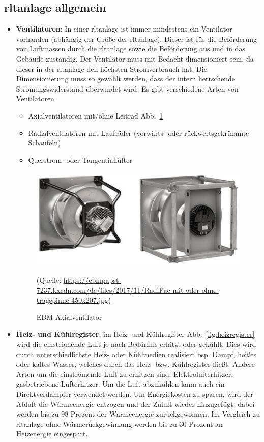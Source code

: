 \subsection{\ac{rltanlage} allgemein}
\begin{itemize}
	\item \textbf{Ventilatoren}: In einer \ac{rltanlage} ist immer mindestens ein Ventilator vorhanden (abhängig der Größe der \ac{rltanlage}). Dieser ist für die Beförderung von Luftmassen durch die \ac{rltanlage} sowie die Beförderung aus und in das Gebäude zuständig. Der Ventilator muss mit Bedacht dimensioniert sein, da dieser in der \ac{rltanlage} den höchsten Stromverbrauch hat. Die Dimensionierung muss so gewählt werden, dass der intern herrschende Strömungswiderstand überwindet wird. Es gibt verschiedene Arten von Ventilatoren 
	\begin{itemize}
		\item Axialventilatoren mit/ohne Leitrad Abb.~\ref{fig:EBM_Axialventilator}
		\item Radialventilatoren mit Laufräder (vorwärts- oder rückwertsgekrümmte Schaufeln)
		\item Querstrom- oder Tangentiallüfter 
	\end{itemize}
	
	\begin{figure}[H]
		\centering
		\includegraphics[width=0.5\linewidth]{Bilder/axialventilator}
		\caption{EBM Axialventilator} 
		(Quelle: \url{https://ebmpapst-7237.kxcdn.com/de/files/2017/11/RadiPac-mit-oder-ohne-tragspinne-450x207.jpg})
		\label{fig:EBM_Axialventilator}
	\end{figure}

	\item \textbf{Heiz- und Kühlregister}: im Heiz- und Kühlregister Abb.~\ref{fig:heizregister} wird die einströmende Luft je nach Bedürfnis erhitzt oder gekühlt. Dies wird durch unterschiedlichste Heiz- oder Kühlmedien realisiert bsp. Dampf, heißes oder kaltes Wasser, welches durch das Heiz- bzw. Kühlregister fließt. Andere Arten um die einströmende Luft zu erhitzen sind: Elektrolufterhitzer, gasbetriebene Lufterhitzer. Um die Luft abzukühlen kann auch ein Direktverdampfer verwendet werden.
	Um Energiekosten zu sparen, wird der Abluft die Wärmeenergie entzogen und der Zuluft wieder hinzugefügt, dabei werden bis zu 98 Prozent der Wärmeenergie zurückgewonnen. Im Vergleich zu \ac{rltanlage} ohne Wärmerückgewinnung werden bis zu 30 Prozent an Heizenergie eingespart. 
	

\end{itemize}
